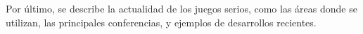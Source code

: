 Por último, se describe la actualidad de los juegos serios, como las áreas donde
se utilizan, las principales conferencias, y ejemplos de desarrollos recientes. 






